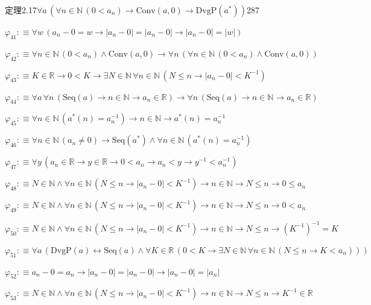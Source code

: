 \begin{fullproof}{定理2.17}{$\forall a\,(\forall n \in \mathbb{N}\,(0 < a_{n}) \to \mathrm{Conv}(a,0) \to \mathrm{DvgP}(a^{\ast}))$}{287}
\begin{abbrevlist}
\item $\varphi_{41} :\equiv \forall w\,(a_{n} - 0 = w \to \lvert a_{n} - 0 \rvert = \lvert a_{n} - 0 \rvert \to \lvert a_{n} - 0 \rvert = \lvert w \rvert)$
\item $\varphi_{42} :\equiv \forall n \in \mathbb{N}\,(0 < a_{n}) \land \mathrm{Conv}(a,0) \to \forall n\,(\forall n \in \mathbb{N}\,(0 < a_{n}) \land \mathrm{Conv}(a,0))$
\item $\varphi_{43} :\equiv K \in \mathbb{R} \to 0 < K \to \exists N \in \mathbb{N}\,\forall n \in \mathbb{N}\,(N \leq n \to \lvert a_{n} - 0 \rvert < K^{-1})$
\item $\varphi_{44} :\equiv \forall a\,\forall n\,(\mathrm{Seq}(a) \to n \in \mathbb{N} \to a_{n} \in \mathbb{R}) \to \forall n\,(\mathrm{Seq}(a) \to n \in \mathbb{N} \to a_{n} \in \mathbb{R})$
\item $\varphi_{45} :\equiv \forall n \in \mathbb{N}\,(a^{\ast}(n) = a_{n}^{-1}) \to n \in \mathbb{N} \to a^{\ast}(n) = a_{n}^{-1}$
\item $\varphi_{46} :\equiv \forall n \in \mathbb{N}\,(a_{n} \neq 0) \to \mathrm{Seq}(a^{\ast}) \land \forall n \in \mathbb{N}\,(a^{\ast}(n) = a_{n}^{-1})$
\item $\varphi_{47} :\equiv \forall y\,(a_{n} \in \mathbb{R} \to y \in \mathbb{R} \to 0 < a_{n} \to a_{n} < y \to y^{-1} < a_{n}^{-1})$
\item $\varphi_{48} :\equiv N \in \mathbb{N} \land \forall n \in \mathbb{N}\,(N \leq n \to \lvert a_{n} - 0 \rvert < K^{-1}) \to n \in \mathbb{N} \to N \leq n \to 0 \leq a_{n}$
\item $\varphi_{49} :\equiv N \in \mathbb{N} \land \forall n \in \mathbb{N}\,(N \leq n \to \lvert a_{n} - 0 \rvert < K^{-1}) \to n \in \mathbb{N} \to N \leq n \to 0 < a_{n}$
\item $\varphi_{50} :\equiv N \in \mathbb{N} \land \forall n \in \mathbb{N}\,(N \leq n \to \lvert a_{n} - 0 \rvert < K^{-1}) \to n \in \mathbb{N} \to N \leq n \to (K^{-1})^{-1} = K$
\item $\varphi_{51} :\equiv \forall a\,(\mathrm{DvgP}(a) \leftrightarrow \mathrm{Seq}(a) \land \forall K \in \mathbb{R}\,(0 < K \to \exists N \in \mathbb{N}\,\forall n \in \mathbb{N}\,(N \leq n \to K < a_{n})))$
\item $\varphi_{52} :\equiv a_{n} - 0 = a_{n} \to \lvert a_{n} - 0 \rvert = \lvert a_{n} - 0 \rvert \to \lvert a_{n} - 0 \rvert = \lvert a_{n} \rvert$
\item $\varphi_{53} :\equiv N \in \mathbb{N} \land \forall n \in \mathbb{N}\,(N \leq n \to \lvert a_{n} - 0 \rvert < K^{-1}) \to n \in \mathbb{N} \to N \leq n \to K^{-1} \in \mathbb{R}$

\end{abbrevlist}
\end{fullproof}
